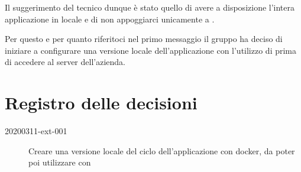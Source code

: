 \documentclass{article}
\begin{document}
Il suggerimento del tecnico dunque è stato quello di avere a disposizione l'intera applicazione in locale e di non appoggiarci unicamente a .

Per questo e per quanto riferitoci nel primo messaggio il gruppo ha deciso di iniziare a configurare una versione locale dell'applicazione con l'utilizzo di  prima di accedere al server dell'azienda.


\newpage
\section{Registro delle decisioni}%
\label{sec:registro_delle_decisioni}

\begin{description}
  \item[20200311-ext-001] Creare una versione locale del ciclo dell'applicazione con docker, da poter poi utilizzare con 
\end{description}
\end{document}
